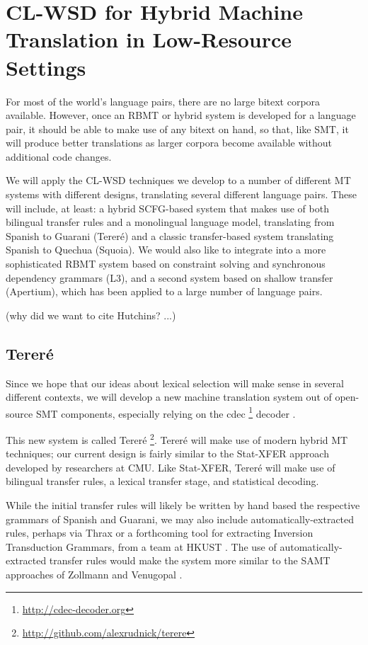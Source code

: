 \section{CL-WSD for Hybrid Machine Translation in Low-Resource Settings}
For most of the world's language pairs, there are no large bitext corpora
available.
However, once an RBMT or hybrid system is developed for a language pair, it
should be able to make use of any bitext on hand, so that, like SMT, it will
produce better translations as larger corpora become available without
additional code changes.

We will apply the CL-WSD techniques we develop to a number of different MT
systems with different designs, translating several different language pairs.
These will include, at least: a hybrid SCFG-based system that makes use of both
bilingual transfer rules and a monolingual language model, translating from
Spanish to Guarani (Tereré) and a classic transfer-based system translating
Spanish to Quechua (Squoia).
We would also like to integrate into a more sophisticated RBMT system based on
constraint solving and synchronous dependency grammars (L3),
and a second system based on shallow transfer (Apertium), which has been
applied to a large number of language pairs.


(why did we want to cite Hutchins? ...)
\cite{hutchins1992introduction}


\subsection{Tereré}
Since we hope that our ideas about lexical selection will make sense in several
different contexts, we will develop a new machine translation system out of
open-source SMT components, especially relying on the cdec
\footnote{\url{http://cdec-decoder.org}} decoder \cite{Dyer_etal_2010}.

This new system is called Tereré
\footnote{\url{http://github.com/alexrudnick/terere}}.
Tereré will make use of modern hybrid MT techniques; our current design is
fairly similar to the Stat-XFER approach \cite{DBLP:conf/cicling/Lavie08}
developed by researchers at CMU.
Like Stat-XFER, Tereré will make use of bilingual transfer rules, a lexical
transfer stage, and statistical decoding.

While the initial transfer rules will likely be written by hand based the
respective grammars of Spanish and Guarani, we may also include
automatically-extracted rules, perhaps via Thrax \cite{weese-EtAl:2011:WMT} or
a forthcoming tool for extracting Inversion Transduction Grammars, from a team
at HKUST \cite{saers-addanki-wu:2013:HyTra}. The use of automatically-extracted
transfer rules would make the system more similar to the SAMT approaches of
Zollmann and Venugopal .


